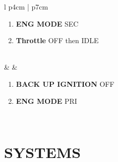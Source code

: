 \documentclass[8pt,usenames,dvipsnames,twoside]{article}
\begin{document}
\begin{center}
\begin{longtable}{l p{4cm} | p{7cm}}
\begin{minipage}[t]{\linewidth}
\begin{enumerate}[label=(\alph*), resume]
						\vspace{-7pt}
						\item \textbf{ENG MODE} \dotfill SEC
						\item \textbf{Throttle} \dotfill OFF then IDLE
					\end{enumerate}
				\end{minipage} \\
				\midrule
				\textbullet &  &
				\begin{minipage}[t]{\linewidth}
					\vspace{-7pt}
					\begin{enumerate}[label=(\alph*)]
						\item \textbf{BACK UP IGNITION} \dotfill OFF
						\item \textbf{ENG MODE} \dotfill PRI
					\end{enumerate}
				\end{minipage} \\
				\bottomrule
			\end{longtable}
		\end{center}
	
		\cleardoublepage
		
		\section{SYSTEMS}
		
\end{document}
